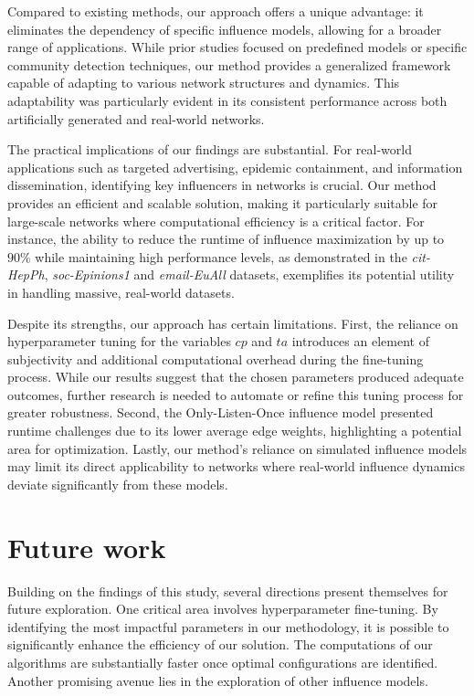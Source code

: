 \documentclass[pdflatex,sn-mathphys-ay]{sn-jnl}
\begin{document}
Compared to existing methods, our approach offers a unique advantage: it eliminates the dependency of specific influence models, allowing for a broader range of applications. While prior studies focused on predefined models or specific community detection techniques, our method provides a generalized framework capable of adapting to various network structures and dynamics. This adaptability was particularly evident in its consistent performance across both artificially generated and real-world networks.

The practical implications of our findings are substantial. For real-world applications such as targeted advertising, epidemic containment, and information dissemination, identifying key influencers in networks is crucial. Our method provides an efficient and scalable solution, making it particularly suitable for large-scale networks where computational efficiency is a critical factor. For instance, the ability to reduce the runtime of influence maximization by up to $90\%$ while maintaining high performance levels, as demonstrated in the \textit{cit-HepPh}, \textit{soc-Epinions1} and \textit{email-EuAll} datasets, exemplifies its potential utility in handling massive, real-world datasets.

Despite its strengths, our approach has certain limitations. First, the reliance on hyperparameter tuning for the variables $cp$ and $ta$ introduces an element of subjectivity and additional computational overhead during the fine-tuning process. While our results suggest that the chosen parameters produced adequate outcomes, further research is needed to automate or refine this tuning process for greater robustness. Second, the Only-Listen-Once influence model presented runtime challenges due to its lower average edge weights, highlighting a potential area for optimization. Lastly, our method’s reliance on simulated influence models may limit its direct applicability to networks where real-world influence dynamics deviate significantly from these models.


\section{Future work}\label{sec_future}

Building on the findings of this study, several directions present themselves for future exploration. One critical area involves hyperparameter fine-tuning. By identifying the most impactful parameters in our methodology, it is possible to significantly enhance the efficiency of our solution. The computations of our algorithms are substantially faster once optimal configurations are identified. Another promising avenue lies in the exploration of other influence models.
\end{document}
